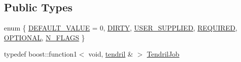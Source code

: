 \subsection*{\-Public \-Types}
\begin{DoxyCompactItemize}
\item 
enum \{ \*
\hyperlink{classecto_1_1tendril_ab63b76909681783917fcb55e3c89f4aca122dd16c5a22a6e22c7caedf7be1d92f}{\-D\-E\-F\-A\-U\-L\-T\-\_\-\-V\-A\-L\-U\-E} = 0, 
\hyperlink{classecto_1_1tendril_ab63b76909681783917fcb55e3c89f4aca7ae45e8526726df642f14c19db78564d}{\-D\-I\-R\-T\-Y}, 
\hyperlink{classecto_1_1tendril_ab63b76909681783917fcb55e3c89f4aca26dbd8778d8007b845bb247f6ce87ff8}{\-U\-S\-E\-R\-\_\-\-S\-U\-P\-P\-L\-I\-E\-D}, 
\hyperlink{classecto_1_1tendril_ab63b76909681783917fcb55e3c89f4acac686a7ccc1227f1ae09d79536683136b}{\-R\-E\-Q\-U\-I\-R\-E\-D}, 
\*
\hyperlink{classecto_1_1tendril_ab63b76909681783917fcb55e3c89f4aca4906c6f7c63b6934ea683ea05716abee}{\-O\-P\-T\-I\-O\-N\-A\-L}, 
\hyperlink{classecto_1_1tendril_ab63b76909681783917fcb55e3c89f4aca8748e76437a722b0cfb3652fefd47d67}{\-N\-\_\-\-F\-L\-A\-G\-S}
 \}
\item 
typedef boost\-::function1$<$ void, \*
\hyperlink{classecto_1_1tendril}{tendril} \& $>$ \hyperlink{classecto_1_1tendril_ad312bffc767516bd2340d02cd9e218ae}{\-Tendril\-Job}
\end{DoxyCompactItemize}
